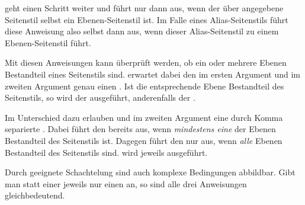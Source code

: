  geht einen Schritt weiter und führt
 nur dann aus, wenn der über 
angegebene Seitenstil selbst ein Ebenen-Seitenstil ist. Im Falle eines
Alias-Seitenstils führt diese Anweisung also selbst dann 
aus, wenn dieser Alias-Seitenstil zu einem Ebenen-Seitenstil führt.%
\EndIndexGroup


\begin{Declaration}
\end{Declaration}
%
%
Mit diesen Anweisungen kann überprüft werden, ob ein oder mehrere Ebenen
Bestandteil eines Seitenstils sind.  erwartet dabei
den  im ersten Argument und im zweiten Argument
genau einen . Ist die
entsprechende Ebene Bestandteil des Seitenstils, so wird der 
ausgeführt, anderenfalls der .

Im Unterschied dazu erlauben  und
 im zweiten Argument eine durch Komma separierte
. Dabei führt
 den
 bereits aus, wenn \emph{mindestens eine} der Ebenen
Bestandteil des Seitenstils ist. Dagegen führt
 den  nur
aus, wenn \emph{alle} Ebenen Bestandteil des Seitenstils sind.  wird jeweils 
ausgeführt.

Durch geeignete Schachtelung sind auch komplexe Bedingungen abbildbar. Gibt
man statt einer  jeweils nur einen  an,
so sind alle drei Anweisungen gleichbedeutend.%
\EndIndexGroup


